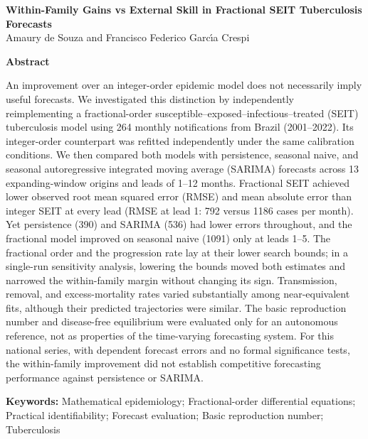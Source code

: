 \documentclass[11pt,a4paper]{article}
\begin{document}
\begin{center}
{\large\bfseries Within-Family Gains vs External Skill in Fractional SEIT Tuberculosis Forecasts}\\[0.6em]
Amaury de Souza and Francisco Federico Garc\'{\i}a Crespi
\end{center}
\medskip
\noindent\textbf{Abstract}\par
An improvement over an integer-order epidemic model does not necessarily imply useful forecasts. We investigated this distinction by independently reimplementing a fractional-order susceptible--exposed--infectious--treated (SEIT) tuberculosis model using 264 monthly notifications from Brazil (2001--2022). Its integer-order counterpart was refitted independently under the same calibration conditions. We then compared both models with persistence, seasonal naive, and seasonal autoregressive integrated moving average (SARIMA) forecasts across 13 expanding-window origins and leads of 1--12 months. Fractional SEIT achieved lower observed root mean squared error (RMSE) and mean absolute error than integer SEIT at every lead (RMSE at lead 1: 792 versus 1186 cases per month). Yet persistence (390) and SARIMA (536) had lower errors throughout, and the fractional model improved on seasonal naive (1091) only at leads 1--5. The fractional order and the progression rate lay at their lower search bounds; in a single-run sensitivity analysis, lowering the bounds moved both estimates and narrowed the within-family margin without changing its sign. Transmission, removal, and excess-mortality rates varied substantially among near-equivalent fits, although their predicted trajectories were similar. The basic reproduction number and disease-free equilibrium were evaluated only for an autonomous reference, not as properties of the time-varying forecasting system. For this national series, with dependent forecast errors and no formal significance tests, the within-family improvement did not establish competitive forecasting performance against persistence or SARIMA.

\medskip
\noindent\textbf{Keywords:} Mathematical epidemiology; Fractional-order differential equations; Practical identifiability; Forecast evaluation; Basic reproduction number; Tuberculosis
\end{document}
